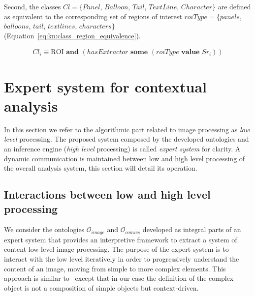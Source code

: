 Second, the classes $Cl=\{Panel$, $Balloon$, $Tail$, $TextLine$, $Character\}$ are defined as equivalent to the corresponding set of regions of interest $roiType = \{panels$, $balloons$, $tail$, $text lines$, $characters\}$ (Equation~\ref{eq:kn:class_region_equivalence}).%
  

\begin{equation}
\label{eq:kn:class_region_equivalence}
\begin{split}
Cl_i  \equiv \text{ROI} \textbf{ and } (hasExtractor \textbf{ some } (roiType \textbf{ value } Sr_i ))
\end{split}
\end{equation}



\section{Expert system for contextual analysis} %
\label{sec:kn:expert_system}

In this section we refer to the algorithmic part related to image processing as \emph{low level} processing. 
The proposed system composed by the developed ontologies and an inference engine (\emph{high level} processing) is called \emph{expert system} for clarity.
A dynamic communication is maintained between low and high level processing of the overall analysis system, this section will detail its operation.


\subsection{Interactions between low and high level processing} %
\label{sub:interactions_between_low_and_high_level_processing}


We consider the ontologies $\mathcal{O}_{image}$ and $\mathcal{O}_{comics}$ developed as integral parts of an expert system that provides an interpretive framework to extract a system of content low level image processing.
The purpose of the expert system is to interact with the low level iteratively in order to progressively understand the content of an image, moving from simple to more complex elements.
This approach is similar to~\cite{Sciascio2011Structured} except that in our case the definition of the complex object is not a composition of simple objects but context-driven.

